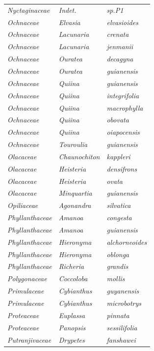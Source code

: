 \documentclass[fleqn,10pt]{ArtEcoFoG} %
\begin{document}
\begin{table}[t]
\begin{tabular}{lll}
\em{Nyctaginaceae} & \em{Indet.} & \em{sp.P1}\\
\em{Ochnaceae} & \em{Elvasia} & \em{elvasioides}\\
\em{Ochnaceae} & \em{Lacunaria} & \em{crenata}\\
\addlinespace
\em{Ochnaceae} & \em{Lacunaria} & \em{jenmanii}\\
\em{Ochnaceae} & \em{Ouratea} & \em{decagyna}\\
\em{Ochnaceae} & \em{Ouratea} & \em{guianensis}\\
\em{Ochnaceae} & \em{Quiina} & \em{guianensis}\\
\em{Ochnaceae} & \em{Quiina} & \em{integrifolia}\\
\addlinespace
\em{Ochnaceae} & \em{Quiina} & \em{macrophylla}\\
\em{Ochnaceae} & \em{Quiina} & \em{obovata}\\
\em{Ochnaceae} & \em{Quiina} & \em{oiapocensis}\\
\em{Ochnaceae} & \em{Touroulia} & \em{guianensis}\\
\em{Olacaceae} & \em{Chaunochiton} & \em{kappleri}\\
\addlinespace
\em{Olacaceae} & \em{Heisteria} & \em{densifrons}\\
\em{Olacaceae} & \em{Heisteria} & \em{ovata}\\
\em{Olacaceae} & \em{Minquartia} & \em{guianensis}\\
\em{Opiliaceae} & \em{Agonandra} & \em{silvatica}\\
\em{Phyllanthaceae} & \em{Amanoa} & \em{congesta}\\
\addlinespace
\em{Phyllanthaceae} & \em{Amanoa} & \em{guianensis}\\
\em{Phyllanthaceae} & \em{Hieronyma} & \em{alchorneoides}\\
\em{Phyllanthaceae} & \em{Hieronyma} & \em{oblonga}\\
\em{Phyllanthaceae} & \em{Richeria} & \em{grandis}\\
\em{Polygonaceae} & \em{Coccoloba} & \em{mollis}\\
\addlinespace
\em{Primulaceae} & \em{Cybianthus} & \em{guyanensis}\\
\em{Primulaceae} & \em{Cybianthus} & \em{microbotrys}\\
\em{Proteaceae} & \em{Euplassa} & \em{pinnata}\\
\em{Proteaceae} & \em{Panopsis} & \em{sessilifolia}\\
\em{Putranjivaceae} & \em{Drypetes} & \em{fanshawei}\\

\end{tabular}
\end{table}
\end{document}
